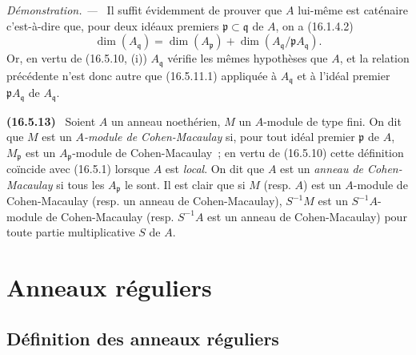 \documentclass[10pt,oneside]{book}
\makeatletter
\newcommand{\setmanualcurrentlabel}[1]{\def\@currentlabel{#1}}
\newenvironment{env}[1][]{\setmanualcurrentlabel{#1}\par\medskip\noindent\textbf{(#1)}\ }{\par}
\newenvironment{proof}{%
  \par\medskip\noindent\textit{Démonstration. ---\ }}{\par}
\makeatother
\begin{document}
\begin{proof}
Il suffit évidemment de prouver que $A$ lui-même est caténaire c'est-à-dire
que, pour deux idéaux premiers $\mathfrak{p}\subset\mathfrak{q}$ de $A$, on a
(16.1.4.2)
\[
  \dim(A_{\mathfrak{q}})
  =\dim(A_{\mathfrak{p}})
  +\dim(A_{\mathfrak{q}}/\mathfrak{p}A_{\mathfrak{q}}).
\]
Or, en vertu de (16.5.10, (i)) $A_{\mathfrak{q}}$ vérifie les mêmes
hypothèses que $A$, et la relation précédente n'est donc autre que
(16.5.11.1) appliquée à $A_{\mathfrak{q}}$ et à l'idéal premier
$\mathfrak{p}A_{\mathfrak{q}}$ de $A_{\mathfrak{q}}$.
\end{proof}

\begin{env}[16.5.13]
\label{0.16.5.13-fr}
Soient $A$ un anneau noethérien, $M$ un $A$-module de type fini. On dit que
$M$ est un \emph{$A$-module de Cohen-Macaulay} si, pour tout idéal premier
$\mathfrak{p}$ de $A$, $M_{\mathfrak{p}}$ est un $A_{\mathfrak{p}}$-module
de Cohen-Macaulay~; en vertu de (16.5.10) cette définition coïncide avec
(16.5.1) lorsque $A$ est \emph{local}. On dit que $A$ est un
\emph{anneau de Cohen-Macaulay} si tous les $A_{\mathfrak{p}}$ le sont. Il est
clair que si $M$ (resp. $A$) est un $A$-module de Cohen-Macaulay (resp. un
anneau de Cohen-Macaulay), $S^{-1}M$ est un $S^{-1}A$-module de Cohen-Macaulay
(resp. $S^{-1}A$ est un anneau de Cohen-Macaulay) pour toute partie
multiplicative $S$ de $A$.
\end{env}


%
\section{Anneaux réguliers}
\label{section:0.17-fr}

\subsection{Définition des anneaux réguliers}
\label{subsection:0.17.1-fr}
\end{document}
